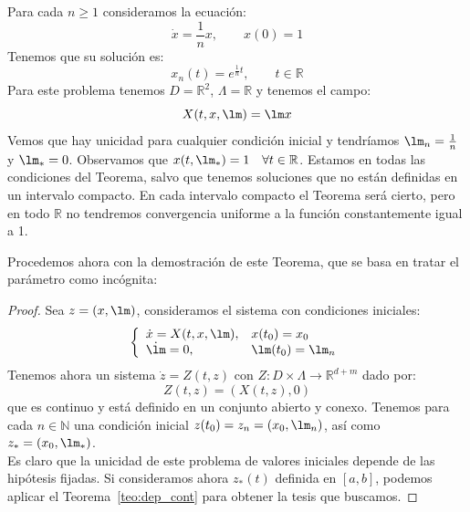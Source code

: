 \begin{ejemplo}
    Para cada $n\geq 1$ consideramos la ecuación:
    \begin{equation*}
        \dot{x} = \frac{1}{n}x, \qquad x(0) = 1
    \end{equation*}
    Tenemos que su solución es: 
    \begin{equation*}
        x_n(t) = e^{\frac{1}{n}t}, \qquad t\in \mathbb{R}
    \end{equation*}
    Para este problema tenemos $D = \mathbb{R}^2$, $\Lambda = \mathbb{R}$ y tenemos el campo:
    \begin{equation*}
        X(t,x,\lm) = \lm x
    \end{equation*}
    Vemos que hay unicidad para cualquier condición inicial y tendríamos $\lm_n = \frac{1}{n}$ y $\lm_\ast = 0$. Observamos que $x(t,\lm_\ast) = 1 \quad \forall t\in \mathbb{R}$. Estamos en todas las condiciones del Teorema, salvo que tenemos soluciones que no están definidas en un intervalo compacto. En cada intervalo compacto el Teorema será cierto, pero en todo $\mathbb{R}$ no tendremos convergencia uniforme a la función constantemente igual a 1.
\end{ejemplo}

\noindent
Procedemos ahora con la demostración de este Teorema, que se basa en tratar el parámetro como incógnita:
\begin{proof} %
    Sea $z = (x,\lm)$, consideramos el sistema con condiciones iniciales:
    \begin{equation*}
        \left\{\begin{array}{ll}
            \dot{x} = X(t,x,\lm), & x(t_0) = x_0 \\
            \dot{\lm} = 0, & \lm(t_0) = \lm_n 
        \end{array}\right.
    \end{equation*}
    Tenemos ahora un sistema $\dot{z} = Z(t,z)$ con $Z:D\times \Lambda\to \mathbb{R}^{d+m}$ dado por:
    \begin{equation*}
        Z(t,z) = (X(t,z),0)
    \end{equation*}
    que es continuo y está definido en un conjunto abierto y conexo. Tenemos para cada $n\in \mathbb{N}$ una condición inicial $z(t_0) = z_n = (x_0, \lm_n)$, así como $z_\ast = (x_0,\lm_\ast)$.\\

    \noindent
    Es claro que la unicidad de este problema de valores iniciales depende de las hipótesis fijadas. Si consideramos ahora $z_\ast(t)$ definida en $[a,b]$, podemos aplicar el Teorema~\ref{teo:dep_cont} para obtener la tesis que buscamos.
\end{proof}

